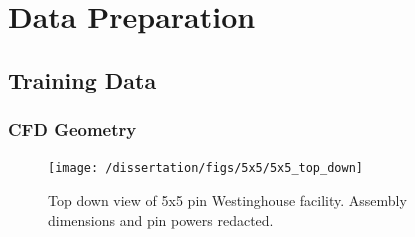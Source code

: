 \documentclass[t, pdftex]{beamer}
\begin{document}
\section[Preprocessing]{Data Preparation}
\subsection*{Training Data}
\begin{frame}
\frametitle{CFD Geometry}
\begin{figure}[H]
    \centering
    \texttt{[image: /dissertation/figs/5x5/5x5\_top\_down]}
    \caption{Top down view of 5x5 pin Westinghouse facility.  Assembly dimensions and pin powers redacted.}
    \label{fig:5x5topdown}
\end{figure}
\end{frame}

\end{document}
